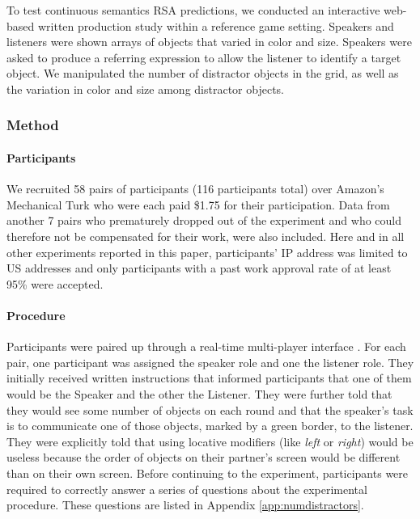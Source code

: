 \documentclass[11pt]{article}
\newcommand{\appref}[1]{Appendix \ref{#1}}
\begin{document}
To test continuous semantics RSA predictions, we conducted an interactive web-based written production study within a reference game setting. %
Speakers and listeners were shown arrays of objects that varied in color and size. Speakers were asked to produce a referring expression to allow the listener to identify a target object. We manipulated the number of distractor objects in the grid, as well as the variation in color and size among distractor objects.


\subsubsection{Method}

\paragraph{Participants}

We recruited 58 pairs of participants (116 participants total) over Amazon's Mechanical Turk who were each paid \$1.75 for their participation. Data from another 7 pairs who prematurely dropped out of the experiment and who could therefore not be compensated for their work, were also included. Here and in all other experiments reported in this paper, participants' IP address was limited to US addresses and only participants with a past work approval rate of at least 95\% were accepted. 

\paragraph{Procedure}

Participants were paired up through a real-time multi-player interface \cite{Hawkins15_RealTimeWebExperiments}. For each pair, one participant was assigned the speaker role and one the listener role. They  initially received written instructions that informed participants that one of them would be the Speaker and the other the Listener. They were further told that they would see some number of objects on each round and that the speaker's task is to communicate one of those objects, marked by a green border, to the listener. They were explicitly told that using locative modifiers (like \emph{left} or \emph{right}) would be useless because the order of objects on their partner's screen would be different than on their own screen. Before continuing to the experiment, participants were required to correctly answer a series of questions about the experimental procedure. These questions are listed in \appref{app:numdistractors}.
\end{document}
